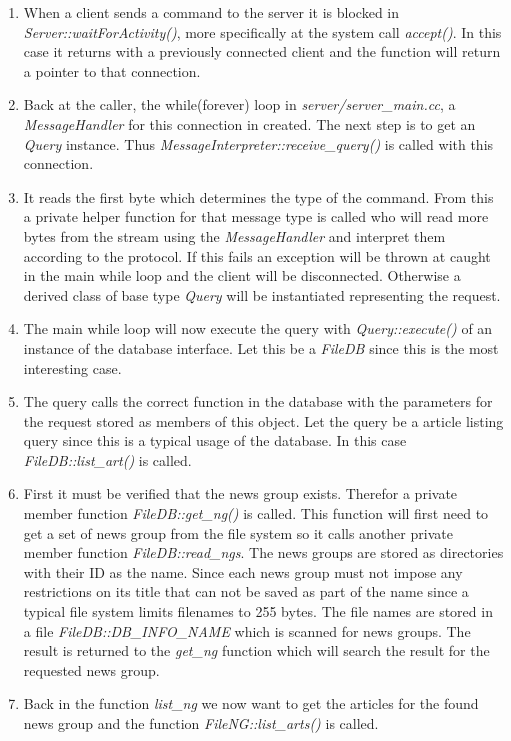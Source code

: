 \documentclass[10pt, a4paper]{article}
\begin{document}
\begin{enumerate}
	\item When a client sends a command to the server it is blocked in \emph{Server::waitForActivity()}, more specifically at the system call \emph{accept()}. In this case it returns with a previously connected client and the function will return a pointer to that connection.
	\item Back at the caller, the while(forever) loop in \emph{server/server\_main.cc}, a \emph{MessageHandler} for this connection in created. The next step is to get an \emph{Query} instance. Thus \emph{MessageInterpreter::receive\_query()} is called with this connection.
	\item It reads the first byte which determines the type of the command. From this a private helper function for that message type is called who will read more bytes from the stream using the \emph{MessageHandler} and interpret them according to the protocol. If this fails an exception will be thrown at caught in the main while loop and the client will be disconnected. Otherwise a derived class of base type \emph{Query} will be instantiated representing the request.
	\item The main while loop will now execute the query with \emph{Query::execute()} of an instance of the database interface. Let this be a \emph{FileDB} since this is the most interesting case.
	\item The query calls the correct function in the database with the parameters for the request stored as members of this object. Let the query be a article listing query since this is a typical usage of the database. In this case \emph{FileDB::list\_art()} is called.
	\item First it must be verified that the news group exists. Therefor a private member function \emph{FileDB::get\_ng()} is called. This function will first need to get a set of news group from the file system so it calls another private member function \emph{FileDB::read\_ngs}. The news groups are stored as directories with their ID as the name. Since each news group must not impose any restrictions on its title that can not be saved as part of the name since a typical file system limits filenames to 255 bytes. The file names are stored in a file \emph{FileDB::DB\_INFO\_NAME} which is scanned for news groups. The result is returned to the \emph{get\_ng} function which will search the result for the requested news group.
	\item Back in the function \emph{list\_ng} we now want to get the articles for the found news group and the function \emph{FileNG::list\_arts()} is called.

\end{enumerate}
\end{document}
